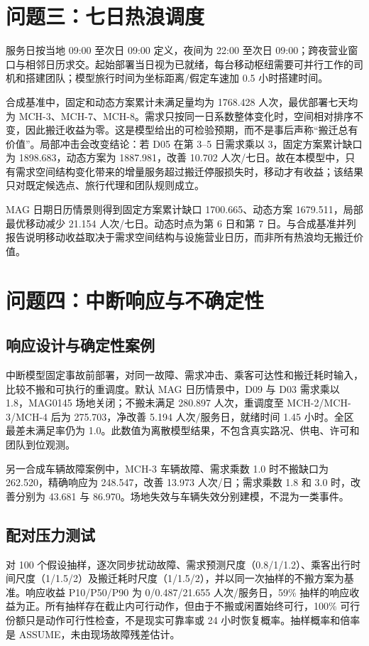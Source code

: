 \documentclass[12pt]{article}
\begin{document}
\section{问题三：七日热浪调度}

服务日按当地 09:00 至次日 09:00 定义，夜间为 22:00 至次日 09:00；跨夜营业窗口与相邻日历求交。起始部署当日视为已就绪，每台移动枢纽需要可并行工作的司机和搭建团队；模型旅行时间为坐标距离/假定车速加 0.5 小时搭建时间。

合成基准中，固定和动态方案累计未满足量均为 1768.428 人次，最优部署七天均为 MCH-3、MCH-7、MCH-8。需求只按同一日系数整体变化时，空间相对排序不变，因此搬迁收益为零。这是模型给出的可检验预期，而不是事后声称“搬迁总有价值”。局部冲击会改变结论：若 D05 在第 3--5 日需求乘以 3，固定方案累计缺口为 1898.683，动态方案为 1887.981，改善 10.702 人次/七日。故在本模型中，只有需求空间结构变化带来的增量服务超过搬迁停服损失时，移动才有收益；该结果只对既定候选点、旅行代理和团队规则成立。

MAG 日期日历情景则得到固定方案累计缺口 1700.665、动态方案 1679.511，局部最优移动减少 21.154 人次/七日。动态时点为第 6 日和第 7 日。与合成基准并列报告说明移动收益取决于需求空间结构与设施营业日历，而非所有热浪均无搬迁价值。

\section{问题四：中断响应与不确定性}

\subsection{响应设计与确定性案例}
中断模型固定事故前部署，对同一故障、需求冲击、乘客可达性和搬迁耗时输入，比较不搬和可执行的重调度。默认 MAG 日历情景中，D09 与 D03 需求乘以 1.8，MAG0145 场地关闭；不搬未满足 280.897 人次，重调度至 MCH-2/MCH-3/MCH-4 后为 275.703，净改善 5.194 人次/服务日，就绪时间 1.45 小时。全区最差未满足率仍为 1.0。此数值为离散模型结果，不包含真实路况、供电、许可和团队到位观测。

另一合成车辆故障案例中，MCH-3 车辆故障、需求乘数 1.0 时不搬缺口为 262.520，精确响应为 248.547，改善 13.973 人次/日；需求乘数 1.8 和 3.0 时，改善分别为 43.681 与 86.970。场地失效与车辆失效分别建模，不混为一类事件。

\subsection{配对压力测试}
对 100 个假设抽样，逐次同步扰动故障、需求预测尺度（0.8/1/1.2）、乘客出行时间尺度（1/1.5/2）及搬迁耗时尺度（1/1.5/2），并以同一次抽样的不搬方案为基准。响应收益 P10/P50/P90 为 0/0.487/21.655 人次/服务日，59\% 抽样的响应收益为正。所有抽样存在截止内可行动作，但由于不搬或闲置始终可行，100\% 可行份额只是动作可行性检查，不是现实可靠率或 24 小时恢复概率。抽样概率和倍率是 ASSUME，未由现场故障残差估计。
\end{document}
